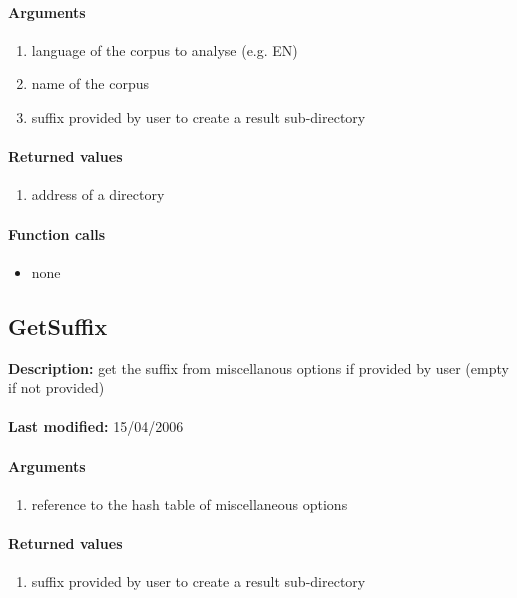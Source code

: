 \paragraph{Arguments}
\begin{enumerate}
\item language of the corpus to analyse (e.g. EN)
\item name of the corpus
\item suffix provided by user to create a result sub-directory
\end{enumerate}

\paragraph{Returned values}
\begin{enumerate}
\item address of a directory
\end{enumerate}

\paragraph{Function calls}
\begin{itemize}
\item none
\end{itemize}

\subsection{GetSuffix}
\textbf{Description:} get the suffix from miscellanous options if provided by user (empty if not provided)\\
\\\textbf{Last modified:} 15/04/2006

\paragraph{Arguments}
\begin{enumerate}
\item reference to the hash table of miscellaneous options
\end{enumerate}

\paragraph{Returned values}
\begin{enumerate}
\item suffix provided by user to create a result sub-directory
\end{enumerate}


